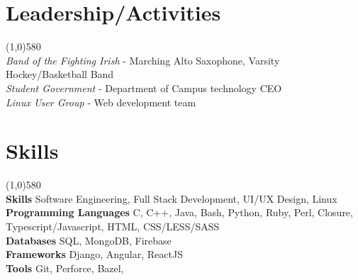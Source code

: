 \documentclass[9pt]{article}
\begin{document}
  \vspace{-16pt}
  \section*{Leadership/Activities}
    \vspace{-16pt}
    \line(1,0){580}\\
    \textit{Band of the Fighting Irish}
    -
    Marching Alto Saxophone, Varsity Hockey/Basketball Band
    \\
    \textit{Student Government}
    -
    Department of Campus technology CEO
    \\
    \textit{Linux User Group}
    -
    Web development team
    
  \vspace{-16pt}
  \section*{Skills}
    \vspace{-16pt}
    \line(1,0){580}\\
    \textbf{Skills}
    Software Engineering,
    Full Stack Development,
    UI/UX Design,
    Linux
    \\
    \textbf{Programming Languages}
    C,
    C++,
    Java,
    Bash,
    Python,
    Ruby,
    Perl,
    Closure,
    Typescript/Javascript,
    HTML,
    CSS/LESS/SASS
    \\
    \textbf{Databases}
    SQL,
    MongoDB,
    Firebase
    \\
    \textbf{Frameworks}
    Django,
    Angular,
    ReactJS
    \\
    \textbf{Tools}
    Git,
    Perforce,
    Bazel,
    \\
\end{document}
